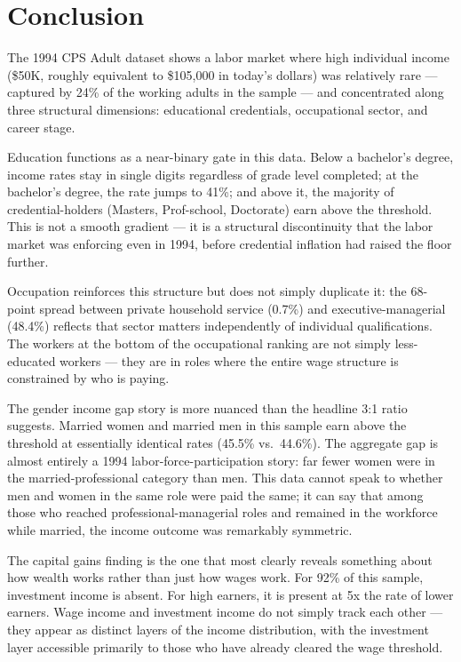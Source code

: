 \documentclass[
  letterpaper,
  DIV=11,
  numbers=noendperiod]{scrartcl}
\begin{document}
\section{Conclusion}\label{conclusion}

The 1994 CPS Adult dataset shows a labor market where high individual
income (\$50K, roughly equivalent to \$105,000 in today's dollars) was
relatively rare --- captured by 24\% of the working adults in the sample
--- and concentrated along three structural dimensions: educational
credentials, occupational sector, and career stage.

Education functions as a near-binary gate in this data. Below a
bachelor's degree, income rates stay in single digits regardless of
grade level completed; at the bachelor's degree, the rate jumps to 41\%;
and above it, the majority of credential-holders (Masters, Prof-school,
Doctorate) earn above the threshold. This is not a smooth gradient ---
it is a structural discontinuity that the labor market was enforcing
even in 1994, before credential inflation had raised the floor further.

Occupation reinforces this structure but does not simply duplicate it:
the 68-point spread between private household service (0.7\%) and
executive-managerial (48.4\%) reflects that sector matters independently
of individual qualifications. The workers at the bottom of the
occupational ranking are not simply less-educated workers --- they are
in roles where the entire wage structure is constrained by who is
paying.

The gender income gap story is more nuanced than the headline 3:1 ratio
suggests. Married women and married men in this sample earn above the
threshold at essentially identical rates (45.5\% vs.~44.6\%). The
aggregate gap is almost entirely a 1994 labor-force-participation story:
far fewer women were in the married-professional category than men. This
data cannot speak to whether men and women in the same role were paid
the same; it can say that among those who reached
professional-managerial roles and remained in the workforce while
married, the income outcome was remarkably symmetric.

The capital gains finding is the one that most clearly reveals something
about how wealth works rather than just how wages work. For 92\% of this
sample, investment income is absent. For high earners, it is present at
5x the rate of lower earners. Wage income and investment income do not
simply track each other --- they appear as distinct layers of the income
distribution, with the investment layer accessible primarily to those
who have already cleared the wage threshold.
\end{document}
